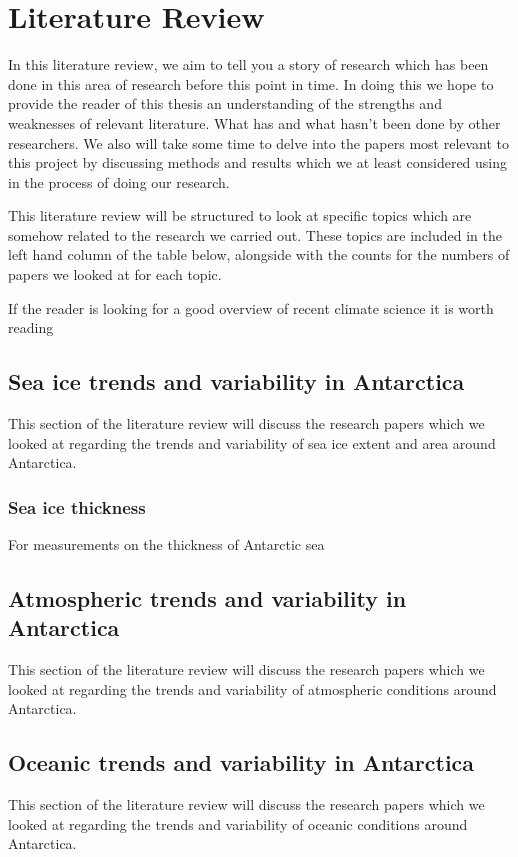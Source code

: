 \documentclass[../main.tex]{subfiles}
\begin{document}
\chapter{Literature Review}
In this literature review, we aim to tell you a story of research which has been done in this area of research before this point in time. In doing this we hope to provide the reader of this thesis an understanding of the strengths and weaknesses of relevant literature. What has and what hasn't been done by other researchers. We also will take some time to delve into the papers most relevant to this project by discussing methods and results which we at least considered using in the process of doing our research.\medskip

This literature review will be structured to look at specific topics which are somehow related to the research we carried out. These topics are included in the left hand column of the table below, alongside with the counts for the numbers of papers we looked at for each topic.

If the reader is looking for a good overview of recent climate science it is worth reading \cite{Clem2015}


\section{Sea ice trends and variability in Antarctica}
This section of the literature review will discuss the research papers which we looked at regarding the trends and variability of sea ice extent and area around Antarctica.

\subsection*{Sea ice thickness}
For measurements on the thickness of Antarctic sea



\section{Atmospheric trends and variability in Antarctica}
This section of the literature review will discuss the research papers which we looked at regarding the trends and variability of atmospheric conditions around Antarctica.


\section{Oceanic trends and variability in Antarctica}
This section of the literature review will discuss the research papers which we looked at regarding the trends and variability of oceanic conditions around Antarctica.
\end{document}

